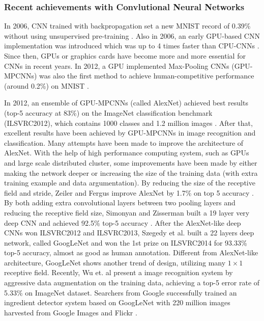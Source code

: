 \subsubsection{Recent achievements with Convlutional Neural Networks}
In 2006, CNN trained with backpropagation set a new MNIST record of 0.39\% without using unsupervised pre-training \cite{marc2006efficient}. Also in 2006, an early GPU-based CNN implementation was introduced which was up to 4 times faster than CPU-CNNs \cite{chellapilla2006high}. Since then, GPUs or graphics cards have become more and more essential for CNNs in recent years. In 2012, a GPU implemented Max-Pooling CNNs (GPU-MPCNNs) was also the first method to achieve human-competitive performance (around 0.2\%) on MNIST \cite{ciresan2012multi}.

In 2012, an ensemble of GPU-MPCNNs (called AlexNet) achieved best results (top-5 accuracy at 83\%) on the ImageNet classification benchmark (ILSVRC2012), which contains 1000 classes and 1.2 million images \cite{krizhevsky2012imagenet}. After that, excellent results have been achieved by GPU-MPCNNs in image recognition and classification. Many attempts have been made to improve the architecture of AlexNet. With the help of high performance computing system, such as GPUs and large scale distributed cluster, some improvements have been made by either making the network deeper or increasing the size of the training data  (with extra training example and data argumentation). By reducing the size of the receptive field and stride, Zeiler and Fergus improve AlexNet by 1.7\% on top 5 accuracy \cite{zeiler2014visualizing}. By both adding extra convolutional layers between two pooling layers and reducing the receptive field size, Simonyan and Zisserman built a 19 layer very deep CNN and achieved 92.5\% top-5 accuracy \cite{simonyan2014very}. After the AlexNet-like deep CNNs won ILSVRC2012 and ILSVRC2013, Szegedy et al. built a 22 layers deep network, called GoogLeNet and won the 1st prize on ILSVRC2014 for 93.33\% top-5 accuracy, almost as good as human annotation\cite{szegedy2014going}. Different from AlexNet-like architecture, GoogLeNet shows another trend of design, utilizing many $1\times 1$ receptive field. Recently, Wu et. al present a image recognition system by aggressive data augmentation on the training data, achieving a top-5 error rate of 5.33\% on ImageNet dataset\cite{wu2015deep}. Searchers from Google successfully trained an ingredient detector system based on GoogLeNet with 220 million images harvested from Google Images and Flickr \cite{malmaud2015s}.  

